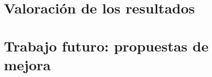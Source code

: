 \documentclass[a4paper,12pt]{article}
\begin{document}

\section{Valoración de los resultados}


\section{Trabajo futuro: propuestas de mejora}

\normalsize


%
%
\end{document}
